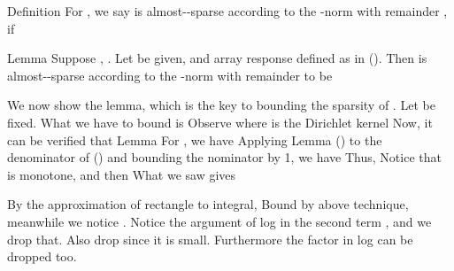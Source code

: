 \Result
{Definition}
{
For , we say  is almost--sparse according to the -norm with remainder , if
}

\Result
{Lemma}
{
Suppose , .
Let \m {\f} be given, and array response  defined as in ().
Then  is almost--sparse according to the -norm with remainder  to be
}

We now show the lemma, which is the key to bounding the sparsity of .
Let  be fixed.
What we have to bound is
Observe
where  is the Dirichlet kernel
Now, it can be verified that
\Result
{Lemma}
{
For , we have
}
Applying Lemma () to the denominator of () and bounding the nominator by 1, we have
Thus,
Notice that  is monotone, and then
What we saw gives

By the approximation of rectangle to integral,
Bound  by above technique, meanwhile we notice .
Notice the argument of log in the second term , and we drop that.
Also drop  since it is small.
Furthermore the \m {2\pi} factor in log can be dropped too.

